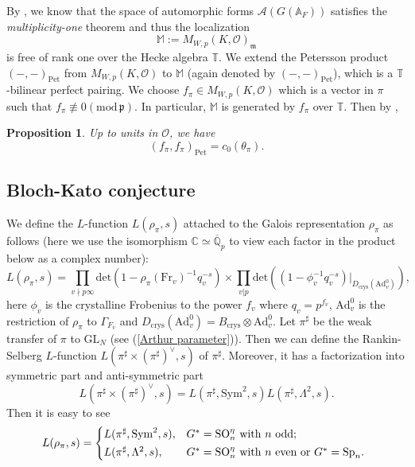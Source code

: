 \documentclass[12pt,oneside,reqno]{amsart}
\theoremstyle{plain}
\newtheorem{proposition}[theorem]{Proposition}
\begin{document}
	
	By \cite[Theorem 4.0.1]{Taibi2018}, we know that the space of automorphic forms $\mathcal{A}(G(\mathbb{A}_F))$ satisfies the \emph{multiplicity-one} theorem and thus the localization
	\[
	\mathbb{M}:=M_{W,p}(K,\mathcal{O})_\mathfrak{m}
	\]
	is free of rank one over the Hecke algebra $\mathbb{T}$. We extend the Petersson product $(-,-)_\mathrm{Pet}$ from $M_{W,p}(K,\mathcal{O})$ to $\mathbb{M}$ (again denoted by $(-,-)_\mathrm{Pet}$), which is a $\mathbb{T}$-bilinear perfect pairing. We choose $f_\pi\in M_{W,p}(K,\mathcal{O})$ which is a vector in $\pi$ such that $f_\pi\not\equiv0(\mathrm{mod}\,\mathfrak{p})$. In particular, $\mathbb{M}$ is generated by $f_\pi$ over $\mathbb{T}$. Then by \cite[§2A]{TilouineUrban2022},
	\begin{proposition}\label{Petersson product vs congruence ideal}
		Up to units in $\mathcal{O}$, we have
		\[
		(f_\pi,f_\pi)_\mathrm{Pet}
		=
		c_0(\theta_\pi).
		\]
	\end{proposition}
	
	
	
	
	
	
	
	\subsection{Bloch-Kato conjecture}
	We define the $L$-function $L(\rho_\pi,s)$ attached to the Galois representation $\rho_\pi$ as follows (here we use the isomorphism $\mathbb{C}\simeq\overline{\mathbb{Q}}_p$ to view each factor in the product below as a complex number):
	\[
	L(\rho_\pi,s)
	=
	\prod_{v\nmid p\infty}
	\mathrm{det}(1-\rho_\pi(\mathrm{Fr}_v)^{-1}q_v^{-s})
	\times
	\prod_{v|p}
	\mathrm{det}((1-\phi_v^{-1}q_v^{-s})|_{D_\mathrm{crys}(\mathrm{Ad}^0_v)}),
	\]
	here $\phi_v$ is the crystalline Frobenius to the power $f_v$ where $q_v=p^{f_v}$, $\mathrm{Ad}^0_v$ is the restriction of $\rho_\pi$ to $\Gamma_{F_v}$
	and $D_\mathrm{crys}(\mathrm{Ad}^0_v)=B_\mathrm{crys}\otimes\mathrm{Ad}^0_v$. Let $\pi^\sharp$ be the weak transfer of $\pi$ to $\mathrm{GL}_N$ (see (\ref{Arthur parameter})). Then we can define the Rankin-Selberg $L$-function $L(\pi^\sharp\times(\pi^\sharp)^\vee,s)$ of $\pi^\sharp$. Moreover, it has a factorization into symmetric part and anti-symmetric part
	\[
	L(\pi^\sharp\times(\pi^\sharp)^\vee,s)
	=
	L(\pi^\sharp,\mathrm{Sym}^2,s)
	L(\pi^\sharp,\Lambda^2,s).
	\]
	Then it is easy to see
	\[
	L(\rho_\pi,s)
	=
	\begin{cases*}
		L(\pi^\sharp,\mathrm{Sym}^2,s),
		&
		$G^\ast=\mathrm{SO}_n^\eta$ with $n$ odd;
		\\
		L(\pi^\sharp,\Lambda^2,s),
		&
		$G^\ast=\mathrm{SO}_n^\eta$ with $n$ even or $G^\ast=\mathrm{Sp}_n$.
	\end{cases*}
	\]
	
\end{document}
